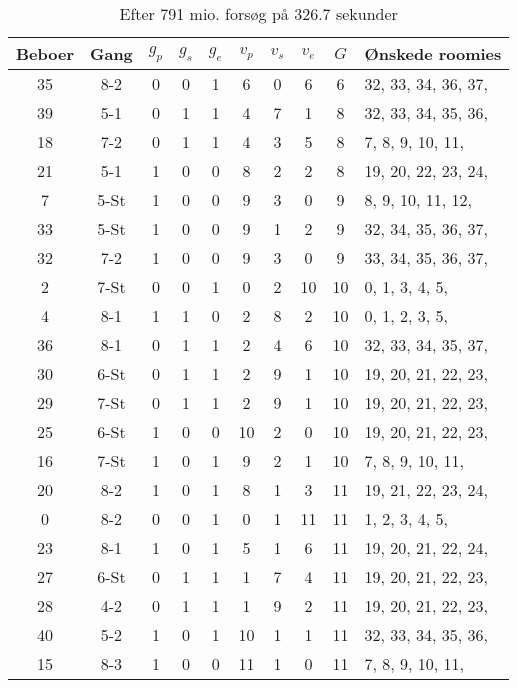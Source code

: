 \documentclass[article,oneside,11pt,a4paper]{memoir}
\newenvironment{assignment}[1]{
\begin{table}[h]
\caption{#1}
\footnotesize
\begin{center}
\begin{tabular}{cccccccccl}
\toprule
Beboer & Gang & $g_p$ & $g_s$ & $g_e$ & $v_p$ & $v_s$ & $v_e$ & $G$ & Ønskede roomies \\ \midrule
}{
\bottomrule
\end{tabular}
\end{center}
\end{table}

}
\begin{document}
\begin{assignment}{Efter 791 mio. forsøg på $326.7$ sekunder}
    35 & 8-2  &   0 &   0 &   1 &   6 &   0 &   6 &  6 &  32, 33, 34, 36, 37, \\
    39 & 5-1  &   0 &   1 &   1 &   4 &   7 &   1 &  8 &  32, 33, 34, 35, 36, \\
    18 & 7-2  &   0 &   1 &   1 &   4 &   3 &   5 &  8 &   7,  8,  9, 10, 11, \\
    21 & 5-1  &   1 &   0 &   0 &   8 &   2 &   2 &  8 &  19, 20, 22, 23, 24, \\
     7 & 5-St &   1 &   0 &   0 &   9 &   3 &   0 &  9 &   8,  9, 10, 11, 12, \\
    33 & 5-St &   1 &   0 &   0 &   9 &   1 &   2 &  9 &  32, 34, 35, 36, 37, \\
    32 & 7-2  &   1 &   0 &   0 &   9 &   3 &   0 &  9 &  33, 34, 35, 36, 37, \\
     2 & 7-St &   0 &   0 &   1 &   0 &   2 &  10 & 10 &   0,  1,  3,  4,  5, \\
     4 & 8-1  &   1 &   1 &   0 &   2 &   8 &   2 & 10 &   0,  1,  2,  3,  5, \\
    36 & 8-1  &   0 &   1 &   1 &   2 &   4 &   6 & 10 &  32, 33, 34, 35, 37, \\
    30 & 6-St &   0 &   1 &   1 &   2 &   9 &   1 & 10 &  19, 20, 21, 22, 23, \\
    29 & 7-St &   0 &   1 &   1 &   2 &   9 &   1 & 10 &  19, 20, 21, 22, 23, \\
    25 & 6-St &   1 &   0 &   0 &  10 &   2 &   0 & 10 &  19, 20, 21, 22, 23, \\
    16 & 7-St &   1 &   0 &   1 &   9 &   2 &   1 & 10 &   7,  8,  9, 10, 11, \\
    20 & 8-2  &   1 &   0 &   1 &   8 &   1 &   3 & 11 &  19, 21, 22, 23, 24, \\
     0 & 8-2  &   0 &   0 &   1 &   0 &   1 &  11 & 11 &   1,  2,  3,  4,  5, \\
    23 & 8-1  &   1 &   0 &   1 &   5 &   1 &   6 & 11 &  19, 20, 21, 22, 24, \\
    27 & 6-St &   0 &   1 &   1 &   1 &   7 &   4 & 11 &  19, 20, 21, 22, 23, \\
    28 & 4-2  &   0 &   1 &   1 &   1 &   9 &   2 & 11 &  19, 20, 21, 22, 23, \\
    40 & 5-2  &   1 &   0 &   1 &  10 &   1 &   1 & 11 &  32, 33, 34, 35, 36, \\
    15 & 8-3  &   1 &   0 &   0 &  11 &   1 &   0 & 11 &   7,  8,  9, 10, 11, \\

\end{assignment}
\end{document}
